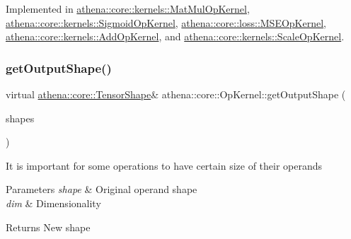 Implemented in \mbox{\hyperlink{classathena_1_1core_1_1kernels_1_1_mat_mul_op_kernel_a75f9e43d1fcecaf9260af31c68cd69db}{athena\+::core\+::kernels\+::\+Mat\+Mul\+Op\+Kernel}}, \mbox{\hyperlink{classathena_1_1core_1_1kernels_1_1_sigmoid_op_kernel_acb639510462e759a92747cec8c32358b}{athena\+::core\+::kernels\+::\+Sigmoid\+Op\+Kernel}}, \mbox{\hyperlink{classathena_1_1core_1_1loss_1_1_m_s_e_op_kernel_ab851ee62ea95c3aab8aab2d28cfa9d04}{athena\+::core\+::loss\+::\+M\+S\+E\+Op\+Kernel}}, \mbox{\hyperlink{classathena_1_1core_1_1kernels_1_1_add_op_kernel_a296a0c69a7b906037324cce2b64827e1}{athena\+::core\+::kernels\+::\+Add\+Op\+Kernel}}, and \mbox{\hyperlink{classathena_1_1core_1_1kernels_1_1_scale_op_kernel_a4f9e4fee100ed7f09840fa4b2d55f2bf}{athena\+::core\+::kernels\+::\+Scale\+Op\+Kernel}}.

\mbox{\label{classathena_1_1core_1_1_op_kernel_a762e541463ffd089b47a8e6755c30fe1}} 
\subsubsection{\texorpdfstring{get\+Output\+Shape()}{getOutputShape()}}
{\footnotesize\ttfamily virtual \mbox{\hyperlink{classathena_1_1core_1_1_tensor_shape}{athena\+::core\+::\+Tensor\+Shape}}\& athena\+::core\+::\+Op\+Kernel\+::get\+Output\+Shape (\begin{DoxyParamCaption}\item[{std\+::vector$<$ \mbox{\hyperlink{classathena_1_1core_1_1_tensor_shape}{athena\+::core\+::\+Tensor\+Shape}} $>$ \&}]{shapes }\end{DoxyParamCaption})\hspace{0.3cm}{\ttfamily [pure virtual]}}

It is important for some operations to have certain size of their operands 
\begin{DoxyParams}{Parameters}
{\em shape} & Original operand shape \\
\hline
{\em dim} & Dimensionality \\
\hline
\end{DoxyParams}
\begin{DoxyReturn}{Returns}
New shape 
\end{DoxyReturn}


